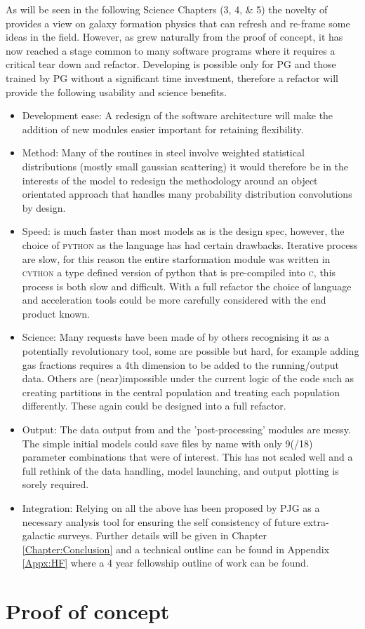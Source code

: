 As will be seen in the following Science Chapters (3, 4, \& 5) the novelty of \steel provides a view on galaxy formation physics that can refresh and re-frame some ideas in the field. However, as \steel grew naturally from the proof of concept, it has now reached a stage common to many software programs where it requires a critical tear down and refactor. Developing \steel is possible only for PG and those trained by PG without a significant time investment, therefore a refactor will provide the following usability and science benefits. 
\begin{itemize}
    \item Development ease: A redesign of the software architecture will make the addition of new modules easier important for retaining flexibility.
    \item Method: Many of the routines in steel involve weighted statistical distributions (mostly small gaussian scattering) it would therefore be in the interests of the model to redesign the methodology around an object orientated approach that handles many probability distribution convolutions by design.
    \item Speed: \steel is much faster than most models as is the design spec, however, the choice of \textsc{python} as the language has had certain drawbacks.  Iterative process are slow, for this reason the entire starformation module was written in \textsc{cython} a type defined version of python that is pre-compiled into \textsc{c}, this process is both slow and difficult. With a full refactor the choice of language and acceleration tools could be more carefully considered with the end product known.
    \item Science: Many requests have been made of \steel by others recognising it as a potentially revolutionary tool, some are possible but hard, for example adding gas fractions requires a 4th dimension to be added to the running/output data. Others are (near)impossible under the current logic of the code such as creating partitions in the central population and treating each population differently. These again could be designed into a full refactor.
    \item Output: The data output from \steel and the 'post-processing' modules are messy. The simple initial models could save files by name with only 9(/18) parameter combinations that were of interest. This has not scaled well and a full rethink of the data handling, model launching, and output plotting is sorely required.
    \item Integration: Relying on all the above \steel has been proposed by PJG as a necessary analysis tool for ensuring the self consistency of future extra-galactic surveys. Further details will be given in Chapter \ref{Chapter:Conclusion} and a technical outline can be found in Appendix \ref{Appx:HF} where a 4 year fellowship outline of work can be found.
\end{itemize}

\pagebreak
\section{Proof of concept}
\label{sec:Proof}
\inputminted{python}{Codes/Proof.py}
